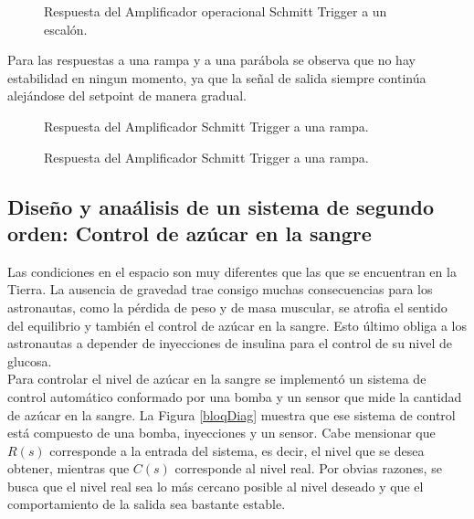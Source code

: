 \documentclass[journal]{IEEEtran}
\begin{document}
\begin{figure}[h]
\caption{Respuesta del Amplificador
operacional Schmitt Trigger a un escal\'on.}
\label{res_escalon}
\end{figure}

Para las respuestas a una rampa y a una par\'abola se 
observa que no hay estabilidad en ningun momento, ya que 
la se\~nal de salida siempre contin\'ua alej\'andose del
setpoint de manera gradual.\\

\begin{figure}[H]
\caption{Respuesta del Amplificador Schmitt Trigger a una
rampa.}
\label{res_rampa}
\caption{Respuesta del Amplificador Schmitt Trigger a una
rampa.}
\label{res_parabola}
\end{figure}

\newpage

\subsection{Dise\~no y ana\'alisis de un sistema de segundo
orden: Control de az\'ucar en la sangre \\} 

Las condiciones en el espacio son muy diferentes que las que
se encuentran en la Tierra. La ausencia de gravedad trae 
consigo muchas consecuencias para los astronautas, como la 
p\'erdida de peso y de masa muscular, se atrofia el sentido 
del equilibrio y tambi\'en el control de az\'ucar en la 
sangre. Esto \'ultimo obliga a los astronautas a depender
de inyecciones de insulina para el control de su nivel de 
glucosa.\\ 

Para controlar el nivel de az\'ucar en la sangre se 
implement\'o un sistema de control autom\'atico conformado
por
una bomba y un sensor que mide la cantidad de az\'ucar en la
sangre. La Figura \ref{bloqDiag} muestra que ese 
sistema de control
est\'a compuesto de una bomba, inyecciones y un sensor. Cabe 
mensionar que $R(s)$ corresponde a la entrada del sistema, 
es decir, el nivel que se desea obtener, mientras que $C(s)$
corresponde al nivel real. Por obvias razones,  se busca que
el nivel real sea lo más cercano posible al nivel deseado y
que el comportamiento de la salida sea bastante estable. \\
\end{document}
